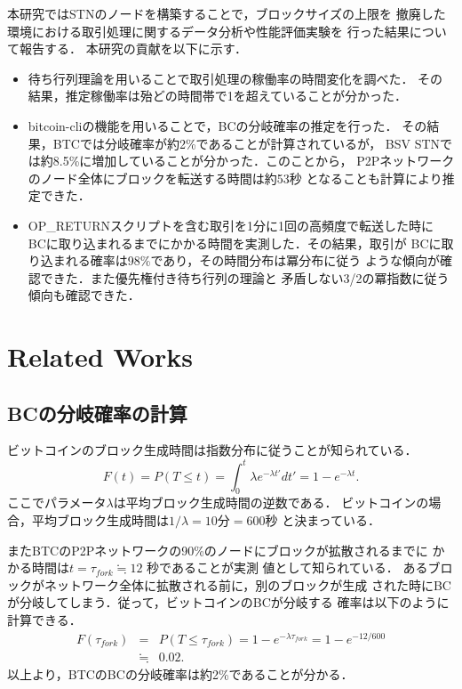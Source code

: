 \documentclass[graybox]{svmult}
\begin{document}
本研究ではSTNのノードを構築することで，ブロックサイズの上限を
撤廃した環境における取引処理に関するデータ分析や性能評価実験を
行った結果について報告する．
本研究の貢献を以下に示す．
%
\begin{itemize}
  \item 待ち行列理論を用いることで取引処理の稼働率の時間変化を調べた．
	その結果，推定稼働率は殆どの時間帯で1を超えていることが分かった．
  \item bitcoin-cliの機能を用いることで，BCの分岐確率の推定を行った．
	その結果，BTCでは分岐確率が約2\%であることが計算されているが，
	BSV STNでは約8.5\%に増加していることが分かった．このことから，
	P2Pネットワークのノード全体にブロックを転送する時間は約53秒
	となることも計算により推定できた．
  \item OP\_RETURNスクリプトを含む取引を1分に1回の高頻度で転送した時に
	BCに取り込まれるまでにかかる時間を実測した．その結果，取引が
        BCに取り込まれる確率は98\%であり，その時間分布は冪分布に従う
	ような傾向が確認できた．また優先権付き待ち行列の理論と
	矛盾しない3/2の冪指数に従う傾向も確認できた．
\end{itemize}
%











\section{Related Works}
\label{sec:rworks}

\subsection{BCの分岐確率の計算}
\label{sec:fork}

ビットコインのブロック生成時間は指数分布に従うことが知られている．
%
\begin{equation}
	F(t) = P(T \le t) = \int_{0}^{t} \lambda e^{-\lambda t'} dt' = 1 - e^{-\lambda t}. \label{eq:exp}
\end{equation}
%
ここでパラメータ$\lambda$は平均ブロック生成時間の逆数である．
ビットコインの場合，平均ブロック生成時間は$1/\lambda=10$分$=600$秒
と決まっている．

またBTCのP2Pネットワークの90\%のノードにブロックが拡散されるまでに
かかる時間は$t = \tau_{fork} \fallingdotseq 12$ 秒であることが実測
値として知られている\cite{bloX}．
あるブロックがネットワーク全体に拡散される前に，別のブロックが生成
された時にBCが分岐してしまう．従って，ビットコインのBCが分岐する
確率は以下のように計算できる．
%
\begin{eqnarray}
  F(\tau_{fork}) &=& P(T \le \tau_{fork}) = 1 - e^{-\lambda \tau_{fork}} = 1 - e^{-12/600} \nonumber \\ 
		 &\fallingdotseq& 0.02. 
\end{eqnarray}
%
以上より，BTCのBCの分岐確率は約2\%であることが分かる．
\end{document}
